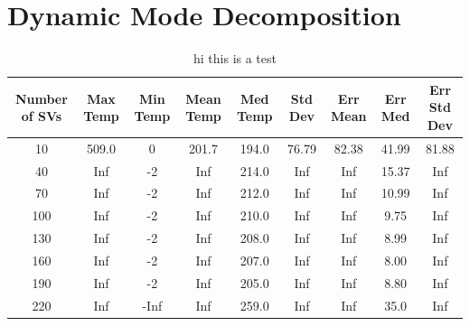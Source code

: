 \documentclass{article}
\begin{document}
\section{Dynamic Mode Decomposition}


\begin{table}
\centering
\begin{tabular}{|c|c|c|c|c|c|c|c|c|}
\hline
Number of SVs & Max Temp & Min Temp & Mean Temp & Med Temp & Std Dev & Err Mean & Err Med & Err Std Dev \\
\hline
10 & 509.0 & 0 & 201.7 & 194.0 & 76.79 & 82.38 & 41.99 & 81.88 \\
\hline
40 & Inf & -2 & Inf & 214.0 & Inf & Inf & 15.37 & Inf \\
\hline
70 & Inf & -2 & Inf & 212.0 & Inf & Inf & 10.99 & Inf \\
\hline
100 & Inf & -2 & Inf & 210.0 & Inf & Inf & 9.75 & Inf \\
\hline
130 & Inf & -2 & Inf & 208.0 & Inf & Inf & 8.99 & Inf \\
\hline 
160 & Inf & -2 & Inf & 207.0 & Inf & Inf & 8.00 & Inf \\
\hline 
190 & Inf & -2 & Inf & 205.0 & Inf & Inf & 8.80 & Inf \\
\hline
220 & Inf & -Inf & Inf & 259.0 & Inf & Inf & 35.0 & Inf \\
\hline

\end{tabular}
\caption{hi this is a test}
\end{table}
\end{document}
